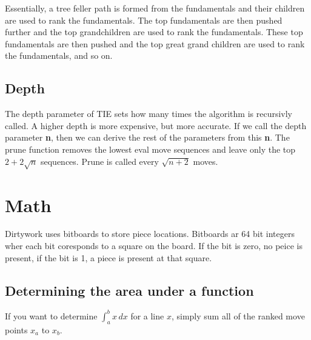 \documentclass[12pt, letterpaper]{article}
\begin{document}
Essentially, a tree feller path is formed from the fundamentals and their children are used to rank the fundamentals.
The top fundamentals are then pushed further and the top grandchildren are used to rank the fundamentals.
These top fundamentals are then pushed and the top great grand children are used to rank the fundamentals, and so on.

\subsection{Depth}
The depth parameter of TIE sets how many times the algorithm is recursivly called.
A higher depth is more expensive, but more accurate.
If we call the depth parameter \textbf{n}, then we can derive the rest of the parameters from this \textbf{n}.
The prune function removes the lowest eval move sequences and leave only the top \(2 + 2\sqrt{n}\) sequences.
Prune is called every \(\sqrt{n + 2}\) moves.

\section{Math}
Dirtywork uses bitboards to store piece locations.
Bitboards ar 64 bit integers wher each bit coresponds to a square on the board.
If the bit is zero, no peice is present, if the bit is 1, a piece is present at that square.

\subsection{Determining the area under a function}
If you want to determine \(\int_a^b x\,dx\) for a line \(x\), simply sum all of the ranked move points \(x_a\) to \(x_b\).
\end{document}
